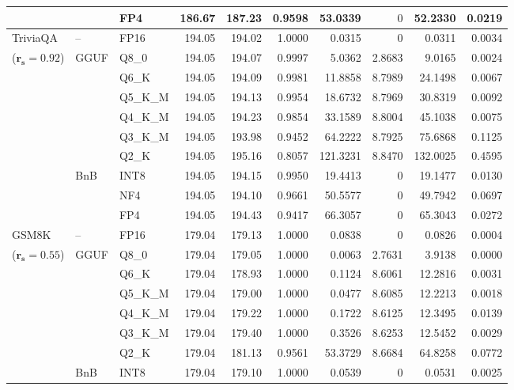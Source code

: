 \begin{longtable}{ll l rrrrrrr}
 &  & FP4 & 186.67 & 187.23 & 0.9598 & 53.0339 & \cellcolor{cyan!12} $0$ & 52.2330 & 0.0219 \\
\midrule
TriviaQA & -- & FP16 & 194.05 & 194.02 & 1.0000 & 0.0315 & \cellcolor{cyan!12} $0$ & 0.0311 & 0.0034 \\
{\small ($\mathbf{r_s{=}0.92}$)} & GGUF & Q8\_0 & 194.05 & 194.07 & 0.9997 & 5.0362 & 2.8683 & 9.0165 & 0.0024 \\
 &  & Q6\_K & 194.05 & 194.09 & 0.9981 & 11.8858 & 8.7989 & 24.1498 & 0.0067 \\
 &  & Q5\_K\_M & 194.05 & 194.13 & 0.9954 & 18.6732 & 8.7969 & 30.8319 & 0.0092 \\
 &  & Q4\_K\_M & 194.05 & 194.23 & 0.9854 & 33.1589 & 8.8004 & 45.1038 & 0.0075 \\
 &  & Q3\_K\_M & 194.05 & 193.98 & \cellcolor{red!18} 0.9452 & \cellcolor{red!18} 64.2222 & 8.7925 & \cellcolor{red!18} 75.6868 & \cellcolor{red!18} 0.1125 \\
 &  & Q2\_K & 194.05 & 195.16 & \cellcolor{red!18} 0.8057 & \cellcolor{red!18} 121.3231 & 8.8470 & \cellcolor{red!18} 132.0025 & \cellcolor{red!18} 0.4595 \\
 & BnB & INT8 & 194.05 & 194.15 & 0.9950 & 19.4413 & \cellcolor{cyan!12} $0$ & 19.1477 & 0.0130 \\
 &  & NF4 & 194.05 & 194.10 & 0.9661 & 50.5577 & \cellcolor{cyan!12} $0$ & 49.7942 & 0.0697 \\
 &  & FP4 & 194.05 & 194.43 & \cellcolor{red!18} 0.9417 & \cellcolor{red!18} 66.3057 & \cellcolor{cyan!12} $0$ & \cellcolor{red!18} 65.3043 & \cellcolor{red!18} 0.0272 \\
\midrule
GSM8K & -- & FP16 & 179.04 & 179.13 & 1.0000 & 0.0838 & \cellcolor{cyan!12} $0$ & 0.0826 & 0.0004 \\
{\small ($\mathbf{r_s{=}0.55}$)} & GGUF & Q8\_0 & 179.04 & 179.05 & 1.0000 & 0.0063 & 2.7631 & 3.9138 & 0.0000 \\
 &  & Q6\_K & 179.04 & 178.93 & 1.0000 & 0.1124 & 8.6061 & 12.2816 & 0.0031 \\
 &  & Q5\_K\_M & 179.04 & 179.00 & 1.0000 & 0.0477 & 8.6085 & 12.2213 & 0.0018 \\
 &  & Q4\_K\_M & 179.04 & 179.22 & 1.0000 & 0.1722 & 8.6125 & 12.3495 & 0.0139 \\
 &  & Q3\_K\_M & 179.04 & 179.40 & 1.0000 & 0.3526 & 8.6253 & 12.5452 & 0.0029 \\
 &  & Q2\_K & 179.04 & 181.13 & 0.9561 & 53.3729 & 8.6684 & 64.8258 & 0.0772 \\
 & BnB & INT8 & 179.04 & 179.10 & 1.0000 & 0.0539 & \cellcolor{cyan!12} $0$ & 0.0531 & 0.0025 \\

\end{longtable}
